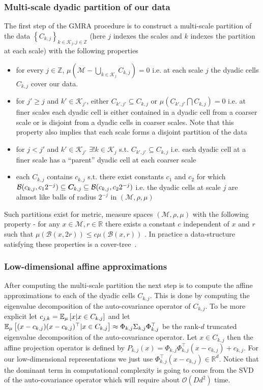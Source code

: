 \documentclass{article}
\begin{document}
	\subsubsection{Multi-scale dyadic partition of our data}
	\label{dyadic_properites}
	The first step of the GMRA procedure is to construct a multi-scale partition of the data $\left\{C_{k,j}\right\}_{k\in\mathcal{K}_j,j\in\mathbb{Z}}$ (here $j$ indexes the scales and $k$ indexes the partition at each scale) with the following properties
	\begin{itemize}
		\item for every $j\in\mathbb{Z}$, $\mu\left(\mathcal{M}-\bigcup_{k\in\mathcal{K}_j}C_{k,j}\right) = 0$ i.e. at each scale $j$ the dyadic cells $C_{k,j}$ cover our data.
		\item for $j'\geq j$ and $k'\in \mathcal{K}_{j'}$, either $C_{k',j'} \subseteq C_{k,j}$ or $\mu\left(C_{k',j'}\bigcap C_{k,j} \right) = 0$ i.e. at finer scales each dyadic cell is either contained in a dyadic cell from a coarser scale or is disjoint from a dyadic cells in coarser scales. Note that this property also implies that each scale forms a disjoint partition of the data
		\item for $j < j'$ and $k'\in \mathcal{K}_{j'}$ $\exists ! k\in\mathcal{K}_j$ s.t. $C_{k',j'} \subseteq C_{k,j}$ i.e. each dyadic cell at a finer scale has a ``parent'' dyadic cell at each coarser scale
		\item each $C_{k,j}$ contains $c_{k,j}$ s.t. there exist constants $c_1$ and $c_2$ for which $\mathcal{B}(c_{k,j},c_1 2^{-j}) \subseteq \boldsymbol{C}_{k,j} \subseteq \mathcal{B}(c_{k,j},c_2 2^{-j})$ i.e. the dyadic cells at scale $j$ are almost like balls of radius $2^{-j}$ in $\left(\mathcal{M},\rho, \mu\right)$
	\end{itemize}
	Such partitions exist for metric, measure spaces $\left(\mathcal{M},\rho, \mu\right)$ with the following property - for any $x \in \mathcal{M}, r \in \mathbb{R}$ there exists a constant $c$ independent of $x$ and $r$ such that $\mu\left(\mathcal{B}(x,2r)\right) \leq c\mu\left(\mathcal{B}(x,r)\right)$ \cite{guy1991wavelets}. In practice a data-structure satisfying these properties is a cover-tree~\cite{beygelzimer2006cover}.
	\subsubsection{Low-dimensional affine approximations}
	After computing the multi-scale partition the next step is to compute the affine approximations to each of the dyadic cells $C_{k,j}$. This is done by computing the eigenvalue decomposition of the auto-covariance operator of $C_{k,j}$. To be more explicit let $c_{j,k} = \mathbb{E}_{\mu}\left[x|x\in C_{k,j}\right]$ and let $\mathbb{E}_{\mu}\left[(x-c_{k,j})(x-c_{k,j})^{\top}|x\in C_{k,j}\right] \approx \Phi_{k,j}\Sigma_{k,j}\Phi_{k,j}^{\top}$ be the rank-$d$ truncated eigenvalue decomposition of the auto-covariance operator. Let $x \in C_{k,j}$ then the affine projection operator is defined by $P_{k,j}(x) = \Phi_{k,j}\Phi_{k,j}^{\top}(x-c_{k,j}) + c_{k,j}$. For our low-dimensional representations we just use $\Phi_{k,j}^{\top}(x-c_{k,j})\in \mathbb{R}^d$. Notice that the dominant term in computational complexity is going to come from the SVD of the auto-covariance operator which will require about $\mathcal{O}(Dd^2)$ time.
\end{document}
